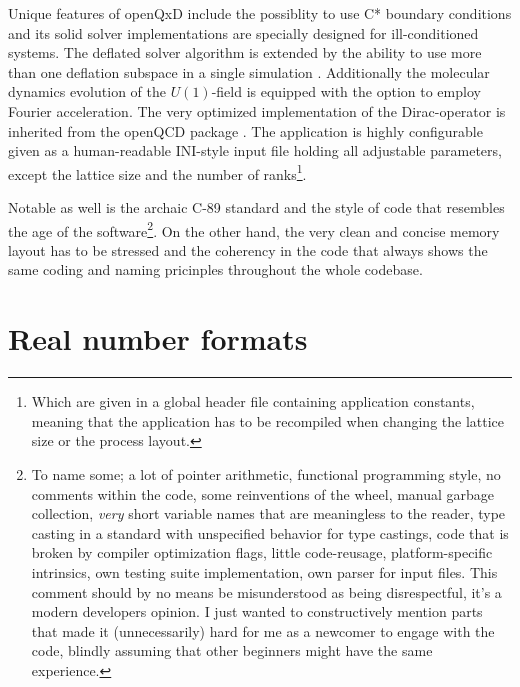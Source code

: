 \documentclass{article}
\theoremstyle{plain} %
\theoremstyle{convention} %
\theoremstyle{remark} %
\numberwithin{equation}{section}
\begin{document}
Unique features of openQxD include the possiblity to use C* boundary conditions and its solid solver implementations are specially designed for ill-conditioned systems. The deflated solver algorithm is extended by the ability to use more than one deflation subspace in a single simulation \cite{openqxd}. Additionally the molecular dynamics evolution of the $U(1)$-field is equipped with the option to employ Fourier acceleration. The very optimized implementation of the Dirac-operator is inherited from the openQCD package \cite{openqcd}. The application is highly configurable given as a human-readable INI-style input file holding all adjustable parameters, except the lattice size and the number of ranks\footnote{Which are given in a global header file containing application constants, meaning that the application has to be recompiled when changing the lattice size or the process layout.}.

Notable as well is the archaic C-89 standard and the style of code that resembles the age of the software\footnote{To name some; a lot of pointer arithmetic, functional programming style, no comments within the code, some reinventions of the wheel, manual garbage collection, \textit{very} short variable names that are meaningless to the reader, type casting in a standard with unspecified behavior for type castings, code that is broken by compiler optimization flags, little code-reusage, platform-specific intrinsics, own testing suite implementation, own parser for input files. This comment should by no means be misunderstood as being disrespectful, it's a modern developers opinion. I just wanted to constructively mention parts that made it (unnecessarily) hard for me as a newcomer to engage with the code, blindly assuming that other beginners might have the same experience.}. On the other hand, the very clean and concise memory layout has to be stressed and the coherency in the code that always shows the same coding and naming pricinples throughout the whole codebase.

\section{Real number formats}

\label{sec:floats}
\end{document}
